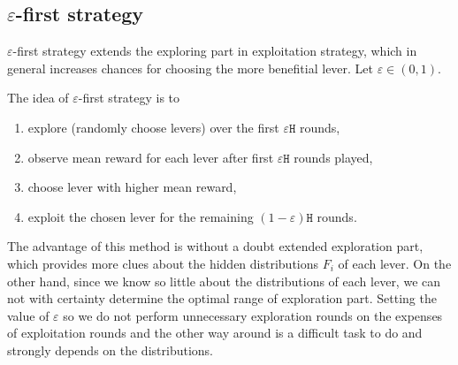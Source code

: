 \documentclass[11pt,american,czech]{article}
\begin{document}
	\subsection*{$\varepsilon$-first strategy}
	$\varepsilon$-first strategy extends the exploring part in exploitation strategy, which in general increases chances for choosing the more benefitial lever. Let $\varepsilon\in(0,1)$. 
	\begin{tcolorbox}[colframe=white]
		The idea of $\varepsilon$-first strategy is to
		\begin{enumerate}
			\item explore (randomly choose levers) over the first $\varepsilon\mathtt{H}$ rounds,
			\item observe mean reward for each lever after first $\varepsilon\mathtt{H}$ rounds played,
			\item choose lever with higher mean reward,
			\item exploit the chosen lever for the remaining $(1-\varepsilon)\mathtt{H}$ rounds.
		\end{enumerate}
	\end{tcolorbox}
	The advantage of this method is without a doubt extended exploration part, which provides more clues about the hidden distributions $F_{i}$ of each lever. On the other hand, since we know so little about the distributions of each lever, we can not with certainty determine the optimal range of exploration part. Setting the value of $\varepsilon$ so we do not perform unnecessary exploration rounds on the expenses of exploitation rounds and the other way around is a difficult task to do and strongly depends on the distributions.
\end{document}
